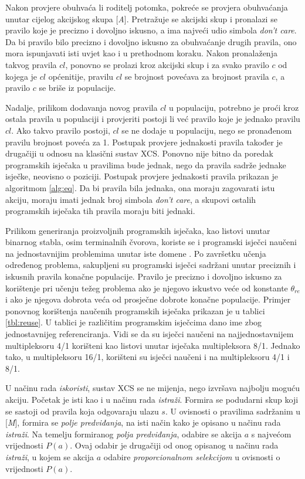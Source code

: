 \documentclass[times, utf8, zavrsni]{fer}
\begin{document}
Nakon provjere obuhvaća li roditelj potomka, pokreće se provjera obuhvaćanja unutar cijelog akcijskog skupa [\emph{A}].
Pretražuje se akcijski skup i pronalazi se pravilo koje je precizno i dovoljno iskusno, a ima najveći udio simbola \emph{don't care}.
Da bi pravilo bilo precizno i dovoljno iskusno za obuhvaćanje drugih pravila, ono mora ispunjavati isti uvjet kao i u prethodnom koraku.
Nakon pronalaženja takvog pravila $cl$, ponovno se prolazi kroz akcijski skup i za svako pravilo $c$ od kojega je $cl$ općenitije, pravilu $cl$ se brojnost povećava za brojnost pravila $c$, a pravilo $c$ se briše iz populacije.

Nadalje, prilikom dodavanja novog pravila $cl$ u populaciju, potrebno je proći kroz ostala pravila u populaciji i provjeriti postoji li već pravilo koje je jednako pravilu $cl$.
Ako takvo pravilo postoji, $cl$ se ne dodaje u populaciju, nego se pronađenom pravilu brojnost poveća za 1.
Postupak provjere jednakosti pravila također je drugačiji u odnosu na klasični sustav XCS.
Ponovno nije bitno da poredak programskih isječaka u pravilima bude jednak, nego da pravila sadrže jednake isječke, neovisno o poziciji.
Postupak provjere jednakosti pravila prikazan je algoritmom \ref{alg:eq}.
Da bi pravila bila jednaka, ona moraju zagovarati istu akciju, moraju imati jednak broj simbola \emph{don't care}, a skupovi ostalih programskih isječaka tih pravila moraju biti jednaki.

Prilikom generiranja proizvoljnih programskih isječaka, kao listovi unutar binarnog stabla, osim terminalnih čvorova, koriste se i programski isječci naučeni na jednostavnijim problemima unutar iste domene \citep{4}.
Po završetku učenja određenog problema, sakupljeni su programski isječci sadržani unutar preciznih i iskusnih pravila konačne populacije.
Pravilo je precizno i dovoljno iskusno za korištenje pri učenju težeg problema ako je njegovo iskustvo veće od konstante $\theta_{re}$ i ako je njegova dobrota veća od prosječne dobrote konačne populacije.
Primjer ponovnog korištenja naučenih programskih isječaka prikazan je u tablici \ref{tbl:reuse}.
U tablici je različitim programskim isječcima dano ime zbog jednostavnijeg referenciranja.
Vidi se da su isječci naučeni na najjednostavnijem multipleksoru 4/1 korišteni kao listovi unutar isječaka multipleksora 8/1.
Jednako tako, u multipleksoru 16/1, korišteni su isječci naučeni i na multipleksoru 4/1 i 8/1.

U načinu rada \emph{iskoristi}, sustav XCS se ne mijenja, nego izvršava najbolju moguću akciju.
Početak je isti kao i u načinu rada \emph{istraži}.
Formira se podudarni skup koji se sastoji od pravila koja odgovaraju ulazu $s$.
U ovisnosti o pravilima sadržanim u [\emph{M}], formira se \emph{polje predviđanja}, na isti način kako je opisano u načinu rada \emph{istraži}.
Na temelju formiranog \emph{polja predviđanja}, odabire se akcija $a$ s najvećom vrijednosti $P(a)$.
Ovaj odabir je drugačiji od onog opisanog u načinu rada \emph{istraži}, u kojem se akcija $a$ odabire \emph{proporcionalnom selekcijom} u ovisnosti o vrijednosti $P(a)$.
\end{document}
